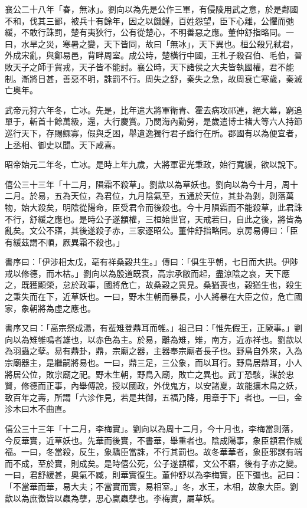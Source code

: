 \begin{pinyinscope}
襄公二十八年「春，無冰」。劉向以為先是公作三軍，有侵陵用武之意，於是鄰國不和，伐其三鄙，被兵十有餘年，因之以饑饉，百姓怨望，臣下心離，公懼而弛緩，不敢行誅罰，楚有夷狄行，公有從楚心，不明善惡之應。董仲舒指略同。一曰，水旱之災，寒暑之變，天下皆同，故曰「無冰」，天下異也。桓公殺兄弒君，外成宋亂，與鄭易邑，背畔周室。成公時，楚橫行中國，王札子殺召伯、毛伯，晉敗天子之師于貿戎，天子皆不能討。襄公時，天下諸侯之大夫皆執國權，君不能制。漸將日甚，善惡不明，誅罰不行。周失之舒，秦失之急，故周衰亡寒歲，秦滅亡奧年。

武帝元狩六年冬，亡冰。先是，比年遣大將軍衛青、霍去病攻祁連，絕大幕，窮追單于，斬首十餘萬級，還，大行慶賞。乃閔海內勤勞，是歲遣博士褚大等六人持節巡行天下，存賜鰥寡，假與乏困，舉遺逸獨行君子詣行在所。郡國有以為便宜者，上丞相、御史以聞。天下咸喜。

昭帝始元二年冬，亡冰。是時上年九歲，大將軍霍光秉政，始行寬緩，欲以說下。

僖公三十三年「十二月，隕霜不殺草」。劉歆以為草妖也。劉向以為今十月，周十二月。於易，五為天位，為君位，九月陰氣至，五通於天位，其卦為剝，剝落萬物，始大殺矣，明陰從陽命，臣受君令而後殺也。今十月隕霜而不能殺草，此君誅不行，舒緩之應也。是時公子遂顓權，三桓始世官，天戒若曰，自此之後，將皆為亂矣。文公不寤，其後遂殺子赤，三家逐昭公。董仲舒指略同。京房易傳曰：「臣有緩茲謂不順，厥異霜不殺也。」

書序曰：「伊涉相太戊，亳有祥桑穀共生。」傳曰：「俱生乎朝，七日而大拱。伊陟戒以修德，而木枯。」劉向以為殷道既衰，高宗承敝而起，盡涼陰之哀，天下應之，既獲顯榮，怠於政事，國將危亡，故桑穀之異見。桑猶喪也，穀猶生也，殺生之秉失而在下，近草妖也。一曰，野木生朝而暴長，小人將暴在大臣之位，危亡國家，象朝將為虛之應也。

書序又曰：「高宗祭成湯，有蜚雉登鼎耳而雊。」祖己曰：「惟先假王，正厥事。」劉向以為雉雊鳴者雄也，以赤色為主。於易，離為雉，雉，南方，近赤祥也。劉歆以為羽蟲之孽。易有鼎卦，鼎，宗廟之器，主器奉宗廟者長子也。野鳥自外來，入為宗廟器主，是繼嗣將易也。一曰，鼎三足，三公象，而以耳行。野鳥居鼎耳，小人將居公位，敗宗廟之祀。野木生朝，野鳥入廟，敗亡之異也。武丁恐駭，謀於忠賢，修德而正事，內舉傅說，授以國政，外伐鬼方，以安諸夏，故能攘木鳥之妖，致百年之壽，所謂「六沴作見，若是共御，五福乃降，用章于下」者也。一曰，金沴木曰木不曲直。

僖公三十三年「十二月，李梅實」。劉向以為周十二月，今十月也，李梅當剝落，今反華實，近草妖也。先華而後實，不書華，舉重者也。陰成陽事，象臣顓君作威福。一曰，冬當殺，反生，象驕臣當誅，不行其罰也。故冬華華者，象臣邪謀有端而不成，至於實，則成矣。是時僖公死，公子遂顓權，文公不寤，後有子赤之變。一曰，君舒緩甚，奧氣不臧，則華實復生。董仲舒以為李梅實，臣下彊也。記曰：「不當華而華，易大夫；不當實而實，易相室。」冬，水王，木相，故象大臣。劉歆以為庶徵皆以蟲為孽，思心蠃蟲孽也。李梅實，屬草妖。


\end{pinyinscope}
